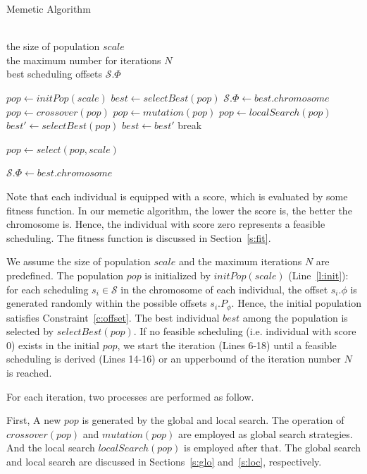 \documentclass[10pt,journal]{IEEEtran}
\newcommand{\calS}{\mathcal{S}}
\theoremstyle{remark}
\begin{document}
\begin{algorithm}[tb]
	\caption{Memetic Algorithm}
	\label{a:alg}
	\renewcommand{\algorithmicrequire}{\textbf{Input:}}
	\renewcommand{\algorithmicensure}{\textbf{Output:}}
	\begin{algorithmic}[1]
		\REQUIRE~~\\
		the size of population $scale$\\
		the maximum number for iterations $N$
		\ENSURE~~\\
		best scheduling offsets $\calS.\Phi$
		
		\STATE $pop \gets initPop(scale)$ \label{l:init}
		\STATE $best \gets selectBest(pop)$
		\RETURN $\calS.\Phi \gets best.chromosome$
		\ENDIF
		\STATE $pop \gets crossover(pop)$
		\STATE $pop \gets mutation(pop)$
		\STATE $pop \gets localSearch(pop)$
		\STATE $best' \gets selectBest(pop)$
		\STATE $best \gets best'$
		\ENDIF    
		\STATE break
		\ENDIF
		
		\STATE $pop \gets select(pop, scale)$
		\ENDFOR
		
		\RETURN $\calS.\Phi \gets best.chromosome$
	\end{algorithmic}
\end{algorithm}	

Note that each individual is equipped with a score, which is evaluated by some fitness function.
In our memetic algorithm,
 the lower the score is, the better the chromosome is.
Hence,
 the individual with score zero represents a feasible scheduling.
The fitness function is discussed in Section~\ref{s:fit}.

We assume the size of population $scale$ and the maximum iterations $N$ are predefined.
The population $pop$ is initialized by $initPop(scale)$ (Line~\ref{l:init}):
for each scheduling $s_{i}\in\calS$ in the chromosome of each individual,
 the offset $s_i.\phi$ is generated randomly within the possible offsets $s_i.P_\phi$.
Hence,
 the initial population satisfies Constraint~\ref{c:offset}.
The best individual $best$ among the population is selected by $selectBest(pop)$.
If no feasible scheduling (i.e. individual with score 0) exists in the initial $pop$, 
we start the iteration (Lines 6-18) until a feasible scheduling is derived (Lines 14-16) or an upperbound of the iteration number $N$ is reached.

For each iteration, two processes are performed as follow.

First, A new $pop$ is generated by the global and local search.
The operation of $crossover(pop)$ and $mutation(pop)$ are employed as global search strategies.
And the local search $localSearch(pop)$ is employed after that.
The global search and local search are discussed in Sections~\ref{s:glo} and~\ref{s:loc}, respectively.
\end{document}
